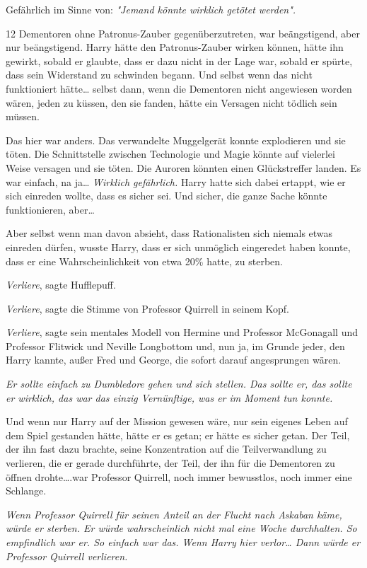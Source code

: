 {Gefährlich im Sinne von: \emph{"Jemand könnte wirklich getötet werden".}

12 Dementoren ohne Patronus-Zauber gegenüberzutreten, war beängstigend, aber nur beängstigend. Harry hätte den Patronus-Zauber wirken können, hätte ihn gewirkt, sobald er glaubte, dass er dazu nicht in der Lage war, sobald er spürte, dass sein Widerstand zu schwinden begann. Und selbst wenn das nicht funktioniert hätte… selbst dann, wenn die Dementoren nicht angewiesen worden wären, jeden zu küssen, den sie fanden, hätte ein Versagen nicht tödlich sein müssen.

Das hier war anders. Das verwandelte Muggelgerät konnte explodieren und sie töten. Die Schnittstelle zwischen Technologie und Magie könnte auf vielerlei Weise versagen und sie töten. Die Auroren könnten einen Glückstreffer landen. Es war einfach, na ja… \emph{Wirklich gefährlich.} Harry hatte sich dabei ertappt, wie er sich einreden wollte, dass es sicher sei. Und sicher, die ganze Sache könnte funktionieren, aber…

Aber selbst wenn man davon absieht, dass Rationalisten sich niemals etwas einreden dürfen, wusste Harry, dass er sich unmöglich eingeredet haben konnte, dass er eine Wahrscheinlichkeit von etwa 20\% hatte, zu sterben.

\emph{Verliere}, sagte Hufflepuff.

\emph{Verliere}, sagte die Stimme von Professor Quirrell in seinem Kopf.

\emph{Verliere}, sagte sein mentales Modell von Hermine und Professor McGonagall und Professor Flitwick und Neville Longbottom und, nun ja, im Grunde jeder, den Harry kannte, außer Fred und George, die sofort darauf angesprungen wären.

\emph{Er sollte einfach zu Dumbledore gehen und sich stellen. Das sollte er, das sollte er wirklich, das war das einzig Vernünftige, was er im Moment tun konnte.}

Und wenn nur Harry auf der Mission gewesen wäre, nur sein eigenes Leben auf dem Spiel gestanden hätte, hätte er es getan; er hätte es sicher getan. Der Teil, der ihn fast dazu brachte, seine Konzentration auf die Teilverwandlung zu verlieren, die er gerade durchführte, der Teil, der ihn für die Dementoren zu öffnen drohte….war Professor Quirrell, noch immer bewusstlos, noch immer eine Schlange.

\emph{Wenn Professor Quirrell für seinen Anteil an der Flucht nach Askaban käme, würde er sterben. Er würde wahrscheinlich nicht mal eine Woche durchhalten. So empfindlich war er. So einfach war das. Wenn Harry hier verlor… Dann würde er Professor Quirrell verlieren.}

}
